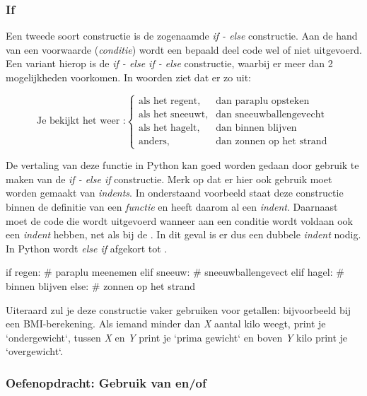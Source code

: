 \documentclass[a4paper,11pt, fleqn]{article}
\begin{document}
\subsubsection{If}
Een tweede soort constructie is de zogenaamde \textit{if - else} constructie. Aan de hand van een voorwaarde (\textit{conditie}) wordt een bepaald deel code wel of niet uitgevoerd. Een variant hierop is de \textit{if - else if - else} constructie, waarbij er meer dan 2 mogelijkheden voorkomen. In woorden ziet dat er zo uit:

\begin{equation}
\text{Je bekijkt het weer :} \left\{ \begin{matrix}\text{als het regent,} & \text{dan paraplu opsteken} \\ 
											\text{als het sneeuwt,} & \text{dan sneeuwballengevecht} \\ 
											\text{als het hagelt,} & \text{dan binnen blijven} \\
											\text{anders,} & \text{dan zonnen op het strand}
							  \end{matrix}\right.
\end{equation}

De vertaling van deze functie in Python kan goed worden gedaan door gebruik te maken van de \textit{if - else if} constructie. Merk op dat er hier ook gebruik moet worden gemaakt van \textit{indents}. In onderstaand voorbeeld staat deze constructie binnen de definitie van een \textit{functie} en heeft daarom al een \textit{indent}. Daarnaast moet de code die wordt uitgevoerd wanneer aan een conditie wordt voldaan ook een \textit{indent} hebben, net als bij de . In dit geval is er dus een dubbele \textit{indent} nodig. In Python wordt \textit{else if} afgekort tot . 

\begin{python}
if regen:
    # paraplu meenemen
elif sneeuw:
    # sneeuwballengevect
elif hagel:
    # binnen blijven
else:
    # zonnen op het strand
\end{python}

Uiteraard zul je deze constructie vaker gebruiken voor getallen: bijvoorbeeld bij een BMI-berekening. Als iemand minder dan \textit{X} aantal kilo weegt, print je `ondergewicht`, tussen \textit{X} en \textit{Y} print je `prima gewicht` en boven \textit{Y} kilo print je `overgewicht`. 

\subsubsection*{Oefenopdracht: Gebruik van  en/of } 
\end{document}
